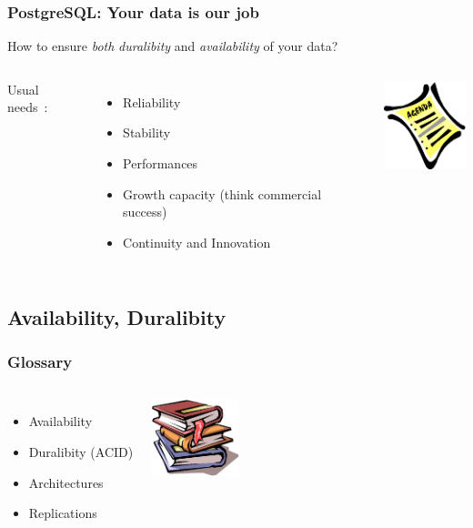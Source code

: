 \documentclass[english]{beamer}
\begin{document}
\begin{frame}[fragile]
  \frametitle{PostgreSQL: Your data is our job}

  \begin{center}
    How to ensure \emph{both} \textit{duralibity} and \textit{availability}
    of your data?
  \end{center}
  \vfill

\begin{columns}[c]

  Usual needs :

  \begin{itemize}
   \item<2-> Reliability
   \item<2-> Stability
   \item<2-> Performances
   \item<3-> Growth capacity (think commercial success)
   \item<3-> Continuity and Innovation
  \end{itemize}  

\begin{center}
  \includegraphics[height=7em]{agenda.jpg}
\end{center}
\end{columns}
\end{frame}

\subsection{Availability, Duralibity}
\frame{\tableofcontents[currentsubsection]}

\begin{frame}
  \frametitle{Glossary}
  
  \vfill

\begin{columns}[c]

  \begin{itemize}
    \item<3,4,6> Availability 
    \item<2,6> Duralibity (ACI\alert{D})
    \item<5,6> Architectures
    \item<1,6> Replications
  \end{itemize}  

\includegraphics[height=6em]{glossaire.jpg}
\end{columns}
\end{frame}
\end{document}
